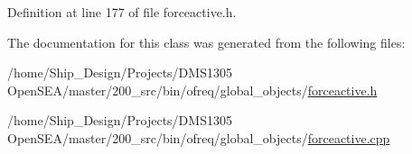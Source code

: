 Definition at line 177 of file forceactive.\-h.



The documentation for this class was generated from the following files\-:\begin{DoxyCompactItemize}
\item 
/home/\-Ship\-\_\-\-Design/\-Projects/\-D\-M\-S1305 Open\-S\-E\-A/master/200\-\_\-src/bin/ofreq/global\-\_\-objects/\hyperlink{forceactive_8h}{forceactive.\-h}\item 
/home/\-Ship\-\_\-\-Design/\-Projects/\-D\-M\-S1305 Open\-S\-E\-A/master/200\-\_\-src/bin/ofreq/global\-\_\-objects/\hyperlink{forceactive_8cpp}{forceactive.\-cpp}\end{DoxyCompactItemize}
